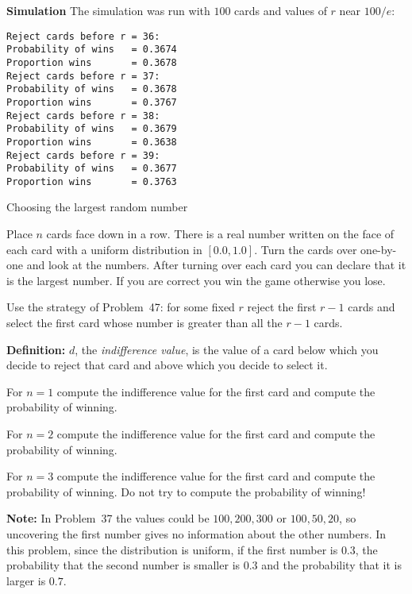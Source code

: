 \textbf{Simulation}
The simulation was run with $100$ cards and values of $r$ near $100/e$:
\begin{verbatim}
Reject cards before r = 36:
Probability of wins   = 0.3674
Proportion wins       = 0.3678
Reject cards before r = 37:
Probability of wins   = 0.3678
Proportion wins       = 0.3767
Reject cards before r = 38:
Probability of wins   = 0.3679
Proportion wins       = 0.3638
Reject cards before r = 39:
Probability of wins   = 0.3677
Proportion wins       = 0.3763
\end{verbatim}


\begin{prob}{Choosing the largest random number}

Place $n$ cards face down in a row. There is a real number  written on the face of each card with a uniform distribution in $[0.0,1.0]$. Turn the cards over one-by-one and look at the numbers. After turning over each card you can declare that it is the largest number. If you are correct you win the game otherwise you lose. 

Use the strategy of Problem~47: for some fixed $r$ reject the first $r-1$ cards and select the first card whose number is greater than all the $r-1$ cards.

\textbf{Definition:} $d$, the \emph{indifference value}, is the value of a card below which you decide to reject that card and above which you decide to select it.

 For $n=1$ compute the indifference value for the first card and compute the probability of winning.

 For $n=2$ compute the indifference value for the first card and compute the probability of winning.

 For $n=3$ compute the indifference value for the first card and compute the probability of winning. Do not try to compute the probability of winning!

\textbf{Note:} In Problem~37 the values could be $100, 200, 300$ or $100, 50, 20$, so uncovering the first number gives no information about the other numbers. In this problem, since the distribution is uniform, if the first number is $0.3$, the probability that the second number is smaller is $0.3$ and the probability that it is larger is $0.7$.
\end{prob}

\solution{}

